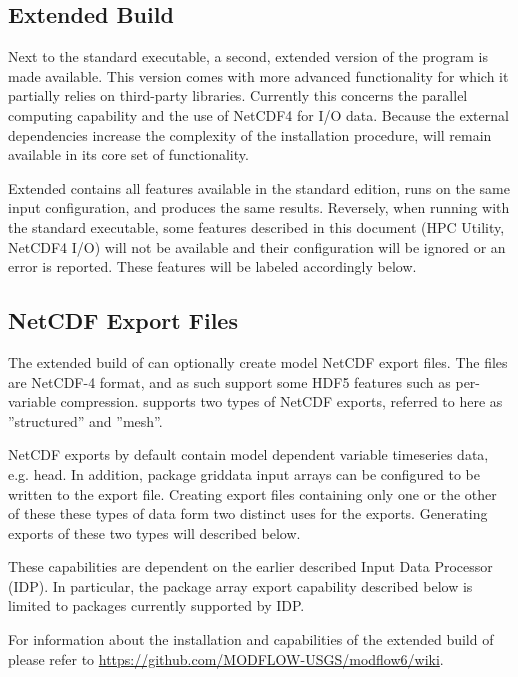 \subsection{\mf Extended Build}

Next to the standard \mf executable, a second, extended version of the program is made available. This version comes with more advanced functionality for which it partially relies on third-party libraries. Currently this concerns the parallel computing capability and the use of NetCDF4 for I/O data. Because the external dependencies increase the complexity of the installation procedure, \mf will remain available in its core set of functionality.

Extended \mf contains all features available in the standard edition, runs on the same input configuration, and produces the same results. Reversely, when running with the standard executable, some features described in this document (HPC Utility, NetCDF4 I/O) will not be available and their configuration will be ignored or an error is reported. These features will be labeled accordingly below.

\subsection{NetCDF Export Files}

The extended build of \mf can optionally create model NetCDF export files.  The files are NetCDF-4 format, and as such support some HDF5 features such as per-variable compression.  \mf supports two types of NetCDF exports, referred to here as ''structured'' and ''mesh''.

\mf NetCDF exports by default contain model dependent variable timeseries data, e.g. head.  In addition, \mf package griddata input arrays can be configured to be written to the export file.  Creating export files containing only one or the other of these these types of data form two distinct uses for the exports.  Generating exports of these two types will described below.

These capabilities are dependent on the earlier described Input Data Processor (IDP).  In particular, the package array export capability described below is limited to packages currently supported by IDP.

For information about the installation and capabilities of the extended build of \mf please refer to \url{https://github.com/MODFLOW-USGS/modflow6/wiki}.

